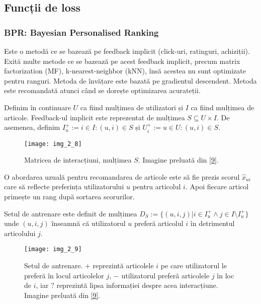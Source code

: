 \subsection{Funcții de loss}

\subsubsection*{BPR: Bayesian Personalised Ranking}

Este o metodă ce se bazează pe feedback implicit (click-uri, ratinguri, achiziții). Exită multe metode ce se bazează pe acest feedback implicit, precum matrix factorization (MF), k-nearest-neighbor (kNN), însă acestea nu sunt optimizate pentru ranguri. Metoda de învățare este bazată pe gradientul descendent. Metoda este recomandată atunci când se dorește optimizarea acurateții.

Definim în continuare $U$ ca fiind mulțimea de utilizatori și $I$ ca fiind mulțimea de articole. Feedback-ul implicit este reprezentat de mulțimea $S \subseteq U \times I$. De asemenea, definim $I_u^+ := {i \in I:(u, i) \in S}$ și $U_i^+ := {u \in U:(u, i) \in S}$.

\begin{figure}[!h]
	\centering
	\texttt{[image: img\_2\_8]}
	\caption[Matricea de interacțiuni]{Matricea de interacțiuni, mulțimea $S$. Imagine preluată din \hyperlink{SteffenRendleChristophFreudenthalerZenoGantnerLarsSchmidtThieme}{[9]}.}
\end{figure} 

O abordarea uzuală pentru recomandarea de articole este să fie prezis scorul $\hat{x}_{ui}$ care să reflecte preferința utilizatorului $u$ pentru articolul $i$. Apoi fiecare articol primește un rang după sortarea scorurilor.

Setul de antrenare este definit de mulțimea $D_S := \{(u,i,j)|i \in I_u^+ \wedge j \in I \setminus I_u^+\}$ unde $(u,i,j)$ înseamnă că utilizatorul $u$ preferă articolul $i$ în detrimentul articolului $j$.

\begin{figure}[!h]
	\centering
	\texttt{[image: img\_2\_9]}
	\caption[Setul de antrenare]{Setul de antrenare. $+$ reprezintă articolele $i$ pe care utilizatorul le preferă în locul articolelor $j$, $-$ utilizatorul preferă articolele $j$ în loc de $i$, iar $?$ reprezintă lipsa informației despre acea interacțiune. Imagine preluată din \hyperlink{SteffenRendleChristophFreudenthalerZenoGantnerLarsSchmidtThieme}{[9]}.}
\end{figure} 

